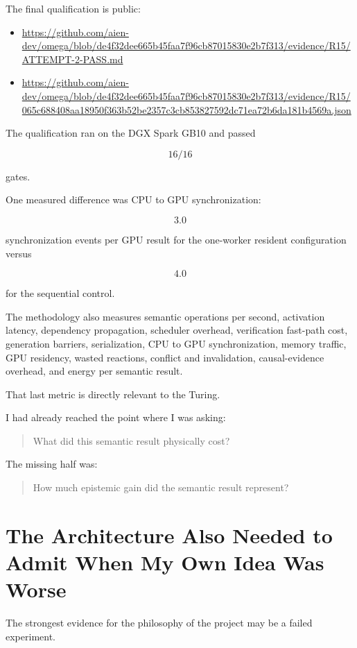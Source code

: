 \documentclass[11pt]{article}
\begin{document}
The final qualification is public:

\begin{itemize}
    \item \url{https://github.com/aien-dev/omega/blob/de4f32dee665b45faa7f96cb87015830e2b7f313/evidence/R15/ATTEMPT-2-PASS.md}
    \item \url{https://github.com/aien-dev/omega/blob/de4f32dee665b45faa7f96cb87015830e2b7f313/evidence/R15/065c688408aa18950f363b52be2357c3cb853827592dc71ea72b6da181b4569a.json}
\end{itemize}

The qualification ran on the DGX Spark GB10 and passed

\[
16/16
\]

gates.

One measured difference was CPU to GPU synchronization:

\[
3.0
\]

synchronization events per GPU result for the one-worker resident configuration versus

\[
4.0
\]

for the sequential control.

The methodology also measures semantic operations per second, activation latency, dependency propagation, scheduler overhead, verification fast-path cost, generation barriers, serialization, CPU to GPU synchronization, memory traffic, GPU residency, wasted reactions, conflict and invalidation, causal-evidence overhead, and energy per semantic result.

That last metric is directly relevant to the Turing.

I had already reached the point where I was asking:

\begin{quote}
What did this semantic result physically cost?
\end{quote}

The missing half was:

\begin{quote}
How much epistemic gain did the semantic result represent?
\end{quote}

\section{The Architecture Also Needed to Admit When My Own Idea Was Worse}

The strongest evidence for the philosophy of the project may be a failed experiment.
\end{document}
